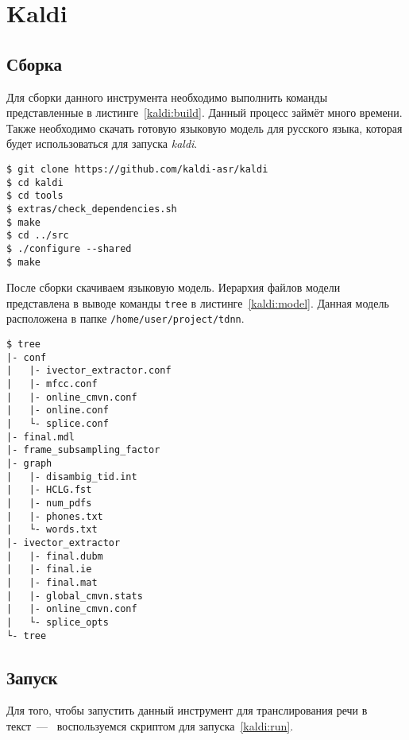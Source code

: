 \section{Kaldi}
\subsection{Сборка}
Для сборки данного инструмента необходимо выполнить команды
представленные в листинге~\ref{kaldi:build}. Данный процесс займёт много времени.
Также необходимо скачать готовую языковую модель для русского языка, которая
будет использоваться для запуска \textit{kaldi}.

\begin{lstlisting}[caption={Сборка Kaldi}, label=kaldi:build]
$ git clone https://github.com/kaldi-asr/kaldi
$ cd kaldi
$ cd tools
$ extras/check_dependencies.sh
$ make
$ cd ../src
$ ./configure --shared
$ make
\end{lstlisting}

После сборки скачиваем языковую модель. Иерархия файлов модели представлена
в выводе команды \texttt{tree} в листинге~\ref{kaldi:model}. Данная модель
расположена в папке \texttt{/home/user/project/tdnn}.

\begin{lstlisting}[caption={Структура языковой модели}, label={kaldi:model}]
$ tree
|- conf
|   |- ivector_extractor.conf
|   |- mfcc.conf
|   |- online_cmvn.conf
|   |- online.conf
|   └- splice.conf
|- final.mdl
|- frame_subsampling_factor
|- graph
|   |- disambig_tid.int
|   |- HCLG.fst
|   |- num_pdfs
|   |- phones.txt
|   └- words.txt
|- ivector_extractor
|   |- final.dubm
|   |- final.ie
|   |- final.mat
|   |- global_cmvn.stats
|   |- online_cmvn.conf
|   └- splice_opts
└- tree
\end{lstlisting}

\subsection{Запуск}
Для того, чтобы запустить данный инструмент для транслирования речи в текст~---~
воспользуемся скриптом для запуска~\ref{kaldi:run}.

